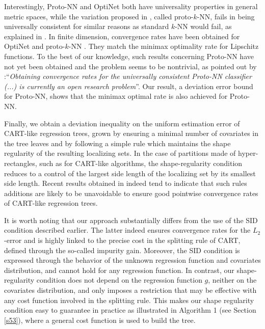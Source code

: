 \documentclass[paper=a4, fontsize=11pt]{scrartcl}
\begin{document}
Interestingly, Proto-NN and OptiNet both have universality properties in general metric spaces, while the variation proposed in \cite{xue2018achieving}, called proto-$k$-NN, fails in being universally consistent for similar reasons as standard $k$-NN would fail, as explained in \cite{cerou2006nearest}. In finite dimension, convergence rates have been obtained for OptiNet \cite{kerem2023error} and proto-$k$-NN \cite{xue2018achieving,gyorfi2021universal}. They match the minimax optimality rate for Lipschitz functions.
To the best of our knowledge, such results concerning Proto-NN have not yet been obtained and the problem seems to be nontrivial, as pointed out by \cite{gyorfi2021universal}:``\textit{Obtaining convergence rates for the universally consistent Proto-NN classifier (...) is currently an open research problem}''. Our result, a deviation error bound for Proto-NN, shows that the minimax optimal rate is also achieved for Proto-NN.


Finally, we obtain a deviation inequality on the uniform estimation error of CART-like regression trees, grown by ensuring a minimal number of covariates in the tree leaves and by following a simple rule which maintains the shape regularity of the resulting localizing sets. In the case of partitions made of hyper-rectangles, such as for CART-like algorithms, the shape-regularity condition reduces to a control of the largest side length of the localizing set by its smallest side length. Recent results obtained in \cite{cattaneo2022pointwise} indeed tend to indicate that such rules additions are likely to be unavoidable to ensure good pointwise convergence rates of CART-like regression trees. 

It is worth noting that our approach substantially differs from the use of the SID condition described earlier. The latter indeed ensures convergence rates for the $L_2$-error and is highly linked to the precise cost in the splitting rule of CART, defined through the so-called impurity gain. Moreover, the SID condition is expressed through the behavior of the unknown regression function and covariates distribution, and cannot hold for any regression function. In contrast, our shape-regularity condition does not depend on the regression function $g$, neither on the covariates distribution, and only imposes a restriction that may be effective with any cost function involved in the splitting rule. This makes our shape regularity condition easy to guarantee in practice as illustrated in Algorithm 1 (see Section \ref{s53}), where a general cost function is used to build the tree.
\end{document}
